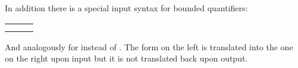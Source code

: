 \begin{isabellebody}
\begin{isamarkuptext}
In addition there is a special input syntax for bounded quantifiers:
\begin{center}
\begin{tabular}{lcl}
\isa{{\isasymforall}x\ {\isasymle}\ y{\isachardot}\ P\ x} & \isa{{\isasymequiv}} & \isa{{\isasymforall}x{\isachardot}\ x\ {\isasymle}\ y\ {\isasymlongrightarrow}\ P\ x} \\
\isa{{\isasymexists}x\ {\isasymle}\ y{\isachardot}\ P\ x} & \isa{{\isasymequiv}} & \isa{{\isasymexists}x{\isachardot}\ x\ {\isasymle}\ y\ {\isasymand}\ P\ x}
\end{tabular}
\end{center}
And analogously for \isa{{\isacharless}} instead of \isa{{\isasymle}}.
The form on the left is translated into the one on the right upon input but it is not
translated back upon output.%
\end{isamarkuptext}%
\end{isabellebody}%
